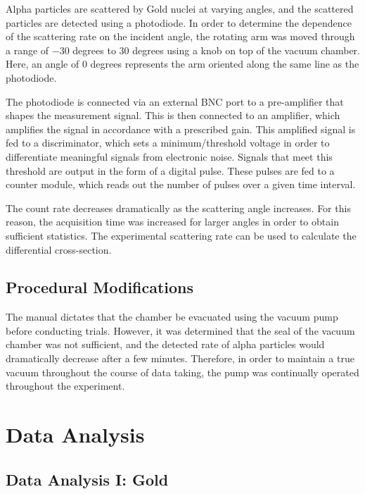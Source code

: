 \documentclass[a4paper]{article}
\begin{document}
\qq Alpha particles are scattered by Gold nuclei at varying angles, and the
scattered particles are detected using a photodiode. In order to determine the
dependence of the scattering rate on the incident angle, the rotating arm was
moved through a range of $-30$ degrees to $30$ degrees using a knob on top of
the vacuum chamber. Here, an angle of 0 degrees represents the arm oriented
along the same line as the photodiode.

\qq The photodiode is connected via an external BNC port to a pre-amplifier that
shapes the measurement signal. This is then connected to an amplifier, which
amplifies the signal in accordance with a prescribed gain. This amplified signal
is fed to a discriminator, which sets a minimum/threshold voltage in order to
differentiate meaningful signals from electronic noise. Signals that meet this
threshold are output in the form of a digital pulse. These pulses are fed to a
counter module, which reads out the number of pulses over a given time interval.

The count rate decreases dramatically as the scattering angle increases. For
this reason, the acquisition time was increased for larger angles in order to
obtain sufficient statistics. The experimental scattering rate can be used to
calculate the differential cross-section.

\subsection{Procedural Modifications}
\qq The manual dictates that the chamber be evacuated using the vacuum pump
before conducting trials. However, it was determined that the seal of the vacuum
chamber was not sufficient, and the detected rate of alpha particles would
dramatically decrease after a few minutes. Therefore, in order to maintain a
true vacuum throughout the course of data taking, the pump was continually
operated throughout the experiment.  \qq

\section{Data Analysis}

\subsection{Data Analysis I: Gold}
\end{document}
